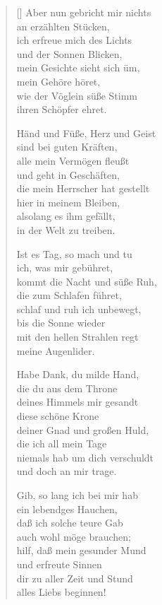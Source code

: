 \begin{multicols}{2}
\begin{verse}[\versewidth]
 Aber nun gebricht mir nichts\\
an erzählten Stücken,\\
ich erfreue mich des Lichts\\
und der Sonnen Blicken,\\
mein Gesichte sieht sich üm,\\
mein Gehöre höret,\\
wie der Vöglein süße Stimm\\
ihren Schöpfer ehret.

 Händ und Füße, Herz und Geist\\
sind bei guten Kräften,\\
alle mein Vermögen fleußt\\
und geht in Geschäften,\\
die mein Herrscher hat gestellt\\
hier in meinem Bleiben,\\
alsolang es ihm gefällt,\\
in der Welt zu treiben.

 Ist es Tag, so mach und tu\\
ich, was mir gebühret,\\
kommt die Nacht und süße Ruh,\\
die zum Schlafen führet,\\
schlaf und ruh ich unbewegt,\\
bis die Sonne wieder\\
mit den hellen Strahlen regt\\
meine Augenlider.

\vfill\null
\columnbreak

 Habe Dank, du milde Hand,\\
die du aus dem Throne\\
deines Himmels mir gesandt\\
diese schöne Krone\\
deiner Gnad und großen Huld,\\
die ich all mein Tage\\
niemals hab um dich verschuldt\\
und doch an mir trage.

 Gib, so lang ich bei mir hab\\
ein lebendges Hauchen,\\
daß ich solche teure Gab\\
auch wohl möge brauchen;\\
hilf, daß mein gesunder Mund\\
und erfreute Sinnen\\
dir zu aller Zeit und Stund\\
alles Liebs beginnen!

\end{verse}
\end{multicols}

